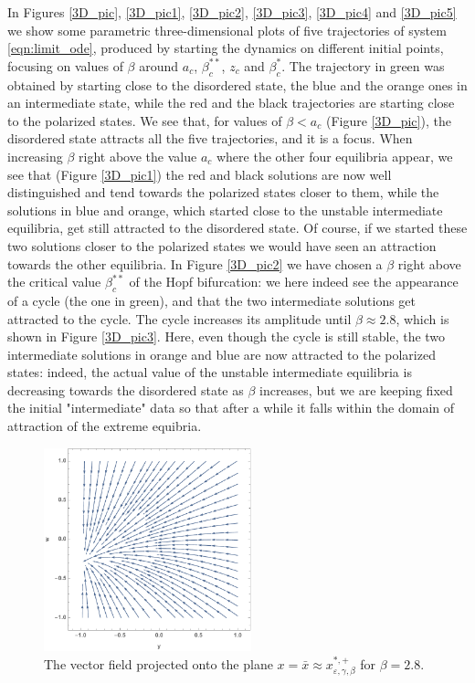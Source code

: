 \documentclass[a4paper,10pt,leqno]{amsart}
\theoremstyle{plain}
\begin{document}
In Figures \ref{3D_pic}, \ref{3D_pic1}, \ref{3D_pic2}, \ref{3D_pic3}, \ref{3D_pic4} and \ref{3D_pic5} we show some parametric three-dimensional plots of five trajectories of system \eqref{eqn:limit_ode}, produced by starting the dynamics on different initial points, focusing on values of $\beta$ around $a_c$, $\beta^{**}_c$, $z_c$ and $\beta^*_c$. The trajectory in green was obtained by starting close to the disordered state, the blue and the orange ones in an intermediate state, while the red and the black trajectories are starting close to the polarized states. 
We see that, for values of $\beta < a_c$ (Figure \ref{3D_pic}), the disordered state attracts all the five trajectories, and it is a focus.
When increasing $\beta$ right above the value $a_c$ where the other four equilibria appear, we see that (Figure \ref{3D_pic1}) the red and black solutions are now well distinguished and tend towards the polarized states closer to them, while the solutions in blue and orange, which started close to the unstable intermediate equilibria, get still attracted to the disordered state. Of course, if we started these two solutions closer to the polarized states we would have seen an attraction towards the other equilibria. 
In Figure \ref{3D_pic2} we have chosen a $\beta$ right above the critical value $\beta^{**}_c$ of the Hopf bifurcation: we here indeed see the appearance of a cycle (the one in green), and that the two intermediate solutions get attracted to the cycle.
The cycle increases its amplitude until $\beta \approx 2.8$, which is shown in Figure \ref{3D_pic3}.  Here, even though the cycle is still stable, the two intermediate solutions in orange and blue are now attracted to the polarized states: indeed, the actual value of the unstable intermediate equilibria is decreasing towards the disordered state as $\beta$ increases, but we are keeping fixed the initial "intermediate" data so that after a while it falls within the domain of attraction of the extreme equibria.
\begin{figure}   
\centering   
\includegraphics[width=6cm]{stream_x.pdf}   
\caption{The vector field projected onto the plane $x = \bar{x} \approx x^{*,+}_{\varepsilon, \gamma, \beta}$ for $\beta = 2.8$.}
\label{stream_x}   
\end{figure}   
\end{document}
